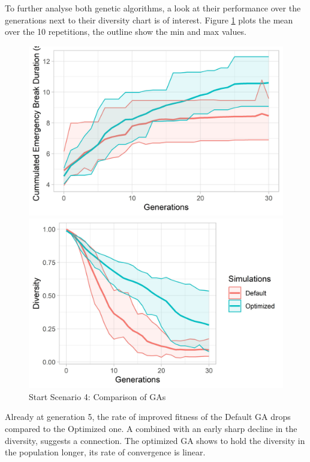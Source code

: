 To further analyse both genetic algorithms, a look at their performance over the generations next to their diversity chart is of interest. Figure \ref{figure:sim_4_ga_comparison} plots the mean over the 10 repetitions, the outline show the min and max values.

\begin{figure}[ht] 
	\label{figure:sim_4_ga_comparison}
	\begin{minipage}[b]{0.5\linewidth}
		\centering
		\includegraphics[width=1\linewidth]{simulations/evaluation/plots/sim_4_ga_generations} 
	\end{minipage}%
	\begin{minipage}[b]{0.5\linewidth}
		\centering
		\includegraphics[width=1\linewidth]{simulations/evaluation/plots/sim_4_ga_diversity} 
	\end{minipage} 
	\caption{Start Scenario 4: Comparison of GAs}
\end{figure}


Already at generation 5, the rate of improved fitness of the Default GA drops compared to the Optimized one. A combined with an early sharp decline in the diversity, suggests a connection. The optimized GA shows to hold the diversity in the population longer, its rate of convergence is linear.